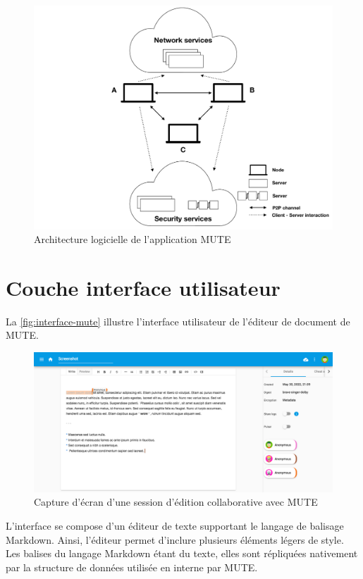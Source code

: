 \begin{figure}[!ht]
  \centering
  \includegraphics[page=2, trim=0cm 0cm 0cm 0cm, clip, width=.7\linewidth]{img/mute-figures.pdf}
  \caption{Architecture logicielle de l'application MUTE}
  \label{fig:architecture-log-mute}
\end{figure}

\section{Couche interface utilisateur}

La \autoref{fig:interface-mute} illustre l'interface utilisateur de l'éditeur de document de MUTE.

\begin{figure}[!ht]
  \centering
  \includegraphics[width=\linewidth]{img/screenshot-mute.png}
  \caption{Capture d'écran d'une session d'édition collaborative avec MUTE}
  \label{fig:interface-mute}
\end{figure}

L'interface se compose d'un éditeur de texte supportant le langage de balisage Markdown.
Ainsi, l'éditeur permet d'inclure plusieurs éléments légers de style.
Les balises du langage Markdown étant du texte, elles sont répliquées nativement par la structure de données utilisée en interne par MUTE.

